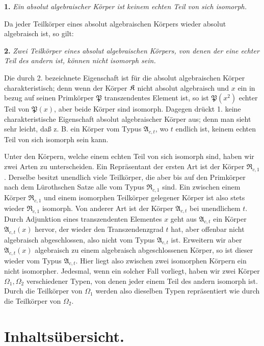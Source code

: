 \textbf{1.} \emph{Ein absolut algebraischer Körper ist keinem echten Teil von sich isomorph.}

Da jeder Teilkörper eines absolut algebraischen Körpers wieder absolut algebraisch ist, so gilt:

\textbf{2.} \emph{Zwei Teilkörper eines absolut algebraischen Körpers, von denen der eine echter Teil des andern ist, können nicht isomorph sein.}

Die durch 2. bezeichnete Eigenschaft ist für die absolut algebraischen Körper charakteristisch; denn wenn der Körper \(\mathfrak K\) nicht absolut algebraisch und \(x\) ein in bezug auf seinen Primkörper \(\mathfrak P\) transzendentes Element ist, so ist \(\mathfrak P(x^2)\) echter Teil von \(\mathfrak P(x)\), aber beide Körper sind isomorph. Dagegen drückt 1. keine charakteristische Eigenschaft absolut algebraischer Körper aus; denn man sieht sehr leicht, daß z. B. ein Körper vom Typus \(\mathfrak A_{c,t}\), wo \(t\) endlich ist, keinem echten Teil von sich isomorph sein kann.

Unter den Körpern, welche einem echten Teil von sich isomorph sind, haben wir zwei Arten zu unterscheiden. Ein Repräsentant der ersten Art ist der Körper \(\mathfrak R_{c,1}\). Derselbe besitzt unendlich viele Teilkörper, die aber bis auf den Primkörper nach dem Lürothschen Satze alle vom Typus \(\mathfrak R_{c,1}\) sind. Ein zwischen einem Körper \(\mathfrak R_{c,1}\) und einem isomorphen Teilkörper gelegener Körper ist also stets wieder \(\mathfrak R_{c,1}\) isomorph. Von anderer Art ist der Körper \(\mathfrak A_{c,t}\) bei unendlichem \(t\). Durch Adjunktion eines transzendenten Elementes \(x\) geht aus \(\mathfrak A_{c,t}\) ein Körper \(\mathfrak A_{c,t}(x)\) hervor, der wieder den Transzendenzgrad \(t\) hat, aber offenbar nicht algebraisch abgeschlossen, also nicht vom Typus \(\mathfrak A_{c,t}\) ist. Erweitern wir aber \(\mathfrak A_{c,t}(x)\) algebraisch zu einem algebraisch abgeschlossenen Körper, so ist dieser wieder vom Typus \(\mathfrak A_{c,t}\). Hier liegt also zwischen zwei isomorphen Körpern ein nicht isomorpher. Jedesmal, wenn ein solcher Fall vorliegt, haben wir zwei Körper \(\Omega_1,\Omega_2\) verschiedener Typen, von denen jeder einem Teil des andern isomorph ist. Durch die Teilkörper von \(\Omega_1\) werden also dieselben Typen repräsentiert wie durch die Teilkörper von \(\Omega_2\).

\section*{Inhaltsübersicht.}

